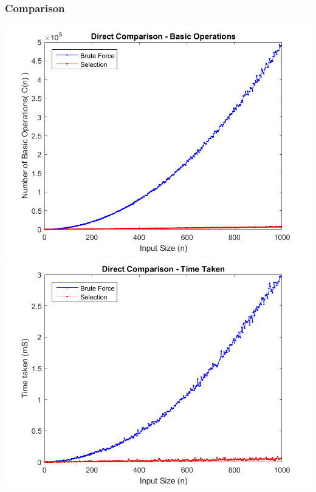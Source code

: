 \documentclass{article}
\begin{document}
        \subsubsection{Comparison}
            \includegraphics[scale=0.6]{Images/direct_comparison_basic_operations.png}\\
            \includegraphics[scale=0.6]{Images/direct_comparison_time_taken.png}
\end{document}
